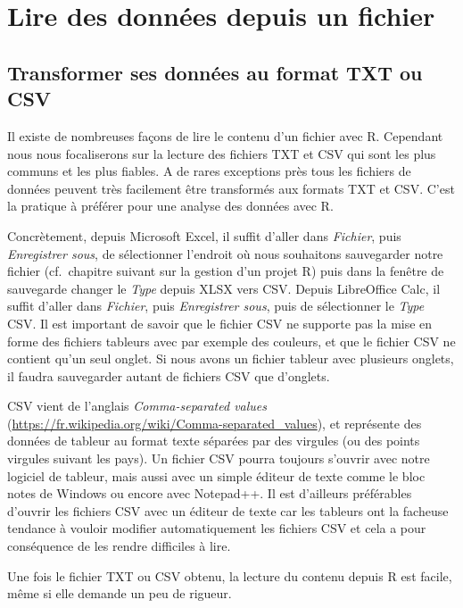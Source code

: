 \documentclass[]{book}
\begin{document}
\hypertarget{l016read}{%
\section{Lire des données depuis un fichier}\label{l016read}}

\hypertarget{l016transfo}{%
\subsection{Transformer ses données au format TXT ou CSV}\label{l016transfo}}

Il existe de nombreuses façons de lire le contenu d'un fichier avec R. Cependant nous nous focaliserons sur la lecture des fichiers TXT et CSV qui sont les plus communs et les plus fiables. A de rares exceptions près tous les fichiers de données peuvent très facilement être transformés aux formats TXT et CSV. C'est la pratique à préférer pour une analyse des données avec R.

Concrètement, depuis Microsoft Excel, il suffit d'aller dans \emph{Fichier}, puis \emph{Enregistrer sous}, de sélectionner l'endroit où nous souhaitons sauvegarder notre fichier (cf.~chapitre suivant sur la gestion d'un projet R) puis dans la fenêtre de sauvegarde changer le \emph{Type} depuis XLSX vers CSV. Depuis LibreOffice Calc, il suffit d'aller dans \emph{Fichier}, puis \emph{Enregistrer sous}, puis de sélectionner le \emph{Type} CSV. Il est important de savoir que le fichier CSV ne supporte pas la mise en forme des fichiers tableurs avec par exemple des couleurs, et que le fichier CSV ne contient qu'un seul onglet. Si nous avons un fichier tableur avec plusieurs onglets, il faudra sauvegarder autant de fichiers CSV que d'onglets.

CSV vient de l'anglais \emph{Comma-separated values} (\url{https://fr.wikipedia.org/wiki/Comma-separated_values}), et représente des données de tableur au format texte séparées par des virgules (ou des points virgules suivant les pays). Un fichier CSV pourra toujours s'ouvrir avec notre logiciel de tableur, mais aussi avec un simple éditeur de texte comme le bloc notes de Windows ou encore avec Notepad++. Il est d'ailleurs préférables d'ouvrir les fichiers CSV avec un éditeur de texte car les tableurs ont la facheuse tendance à vouloir modifier automatiquement les fichiers CSV et cela a pour conséquence de les rendre difficiles à lire.

Une fois le fichier TXT ou CSV obtenu, la lecture du contenu depuis R est facile, même si elle demande un peu de rigueur.
\end{document}
